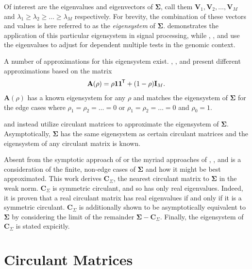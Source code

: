 \documentclass[letterpaper,12pt,oneside,final]{article}
\newcommand{\ve}[1]{\mathbf{#1}}           %
\newcommand{\m}[1]{\mathbf{#1}}               %
\newcommand{\sm}[1]{\boldsymbol{#1}}   %
\newcommand{\tr}[1]{{#1}^{\mkern-1.5mu\mathsf{T}}}              %
\begin{document}
Of interest are the eigenvalues and eigenvectors of $\sm{\Sigma}$, call them $\ve{V}_1, \ve{V}_2, \dots, \ve{V}_M$ and $\lambda_1 \geq \lambda_2 \geq \dots \geq \lambda_M$ respectively. For brevity, the combination of these vectors and values is here referred to as the \emph{eigensystem} of $\sm{\Sigma}$. \cite{gray2006toeplitz} demonstrates the application of this particular eigensystem in signal processing, while \cite{cheverud2001}, \cite{LiJi2005}, and \cite{Galwey2009} use the eigenvalues to adjust for dependent multiple tests in the genomic context.

A number of approximations for this eigensystem exist. \cite{cheverud2001}, \cite{LiJi2005}, and \cite{Galwey2009} present different approximations based on the matrix
\begin{equation} \label{eq:multipleTesting:commonCor}
  \m{A}(\rho) = \rho \ve{1} \tr{\ve{1}} + (1 - \rho) \m{I}_M.
\end{equation}
$\m{A}(\rho)$ has a known eigensystem for any $\rho$ and matches the eigensystem of $\sm{\Sigma}$ for the edge cases where $\rho_1 = \rho_2 = \dots = 0$ or $\rho_1 = \rho_2 = \dots = 0$ and $\rho_0 = 1$. 

\cite{gray2006toeplitz} and \cite{grenanderszego1958} instead utilize circulant matrices to approximate the eigensystem of $\sm{\Sigma}$. Asymptotically, $\sm{\Sigma}$ has the same eigensystem as certain circulant matrices and the eigensystem of any circulant matrix is known.

Absent from the symptotic approach of \cite{gray2006toeplitz} or the myriad approaches of \cite{cheverud2001}, \cite{LiJi2005}, and \cite{Galwey2009} is a consideration of the finite, non-edge cases of $\sm{\Sigma}$ and how it might be best approximated. This work derives $\m{C}_{\Sigma}$, the nearest circulant matrix to $\sm{\Sigma}$ in the weak norm. $\m{C}_{\Sigma}$ is symmetric circulant, and so has only real eigenvalues. Indeed, it is proven that a real circulant matrix has real eigenvalues if and only if it is a symmetric circulant. $\m{C}_{\Sigma}$ is additionally shown to be asymptotically equivalent to $\sm{\Sigma}$ by considering the limit of the remainder $\sm{\Sigma} - \m{C}_{\Sigma}$. Finally, the eigensystem of $\m{C}_{\Sigma}$ is stated expicitly.

\section{Circulant Matrices} \label{c:multipleTesting:circDecom}
\end{document}
